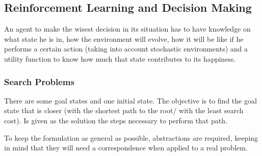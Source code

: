 \subsection{Reinforcement Learning and Decision Making}


An agent to make the wisest decision in its situation has to have knowledge on what state he is in, how the environment will evolve, how it will be like if he performs a certain action (taking into account stochastic environments) and a utility function to  know how much that state contributes to its happiness.


\subsubsection{Search Problems}
There are some goal states and one initial state. The objective is to find the goal state that is closer (with the shortest path to the root/ with the least search cost). Is given as the solution the steps necessary to perform that path.

To keep the formulation as general as possible, abstractions are required, keeping in mind that they will need a correspondence when applied to a real problem.









